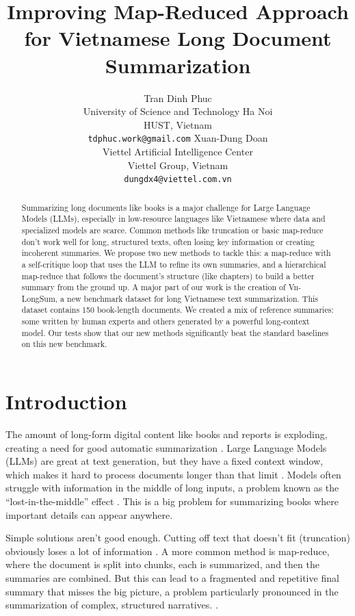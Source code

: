 \documentclass[11pt]{article}
\title{Improving Map-Reduced Approach for Vietnamese Long Document Summarization }
\author{Tran Dinh Phuc \\  University of Science and Technology Ha Noi\\ HUST, Vietnam\\ \texttt{tdphuc.work@gmail.com}
\And
Xuan-Dung Doan \\ Viettel Artificial Intelligence Center \\ Viettel Group, Vietnam \\ \texttt{dungdx4@viettel.com.vn}
}
\begin{document}
\maketitle
\begin{abstract}
Summarizing long documents like books is a major challenge for Large Language Models (LLMs), especially in low-resource languages like Vietnamese where data and specialized models are scarce. Common methods like truncation or basic map-reduce don't work well for long, structured texts, often losing key information or creating incoherent summaries. We propose two new methods to tackle this: a map-reduce with a self-critique loop that uses the LLM to refine its own summaries, and a hierarchical map-reduce that follows the document's structure (like chapters) to build a better summary from the ground up. A major part of our work is the creation of Vn-LongSum, a new benchmark dataset for long Vietnamese text summarization. This dataset contains 150 book-length documents. We created a mix of reference summaries: some written by human experts and others generated by a powerful long-context model. Our tests show that our new methods significantly beat the standard baselines on this new benchmark.
\end{abstract}

\section{Introduction}
\label{sec:introduction}

The amount of long-form digital content like books and reports is exploding, creating a need for good automatic summarization \citep{koh2022survey}. Large Language Models (LLMs) are great at text generation, but they have a fixed context window, which makes it hard to process documents longer than that limit \citep{koh2022survey}. Models often struggle with information in the middle of long inputs, a problem known as the ``lost-in-the-middle'' effect \citep{liu2024lost}. This is a big problem for summarizing books where important details can appear anywhere.

Simple solutions aren't good enough. Cutting off text that doesn't fit (truncation) obviously loses a lot of information \citep{koh2022survey}. A more common method is map-reduce, where the document is split into chunks, each is summarized, and then the summaries are combined. But this can lead to a fragmented and repetitive final summary that misses the big picture, a problem particularly pronounced in the summarization of complex, structured narratives. \citep{kim2025nexussum}.
\end{document}
